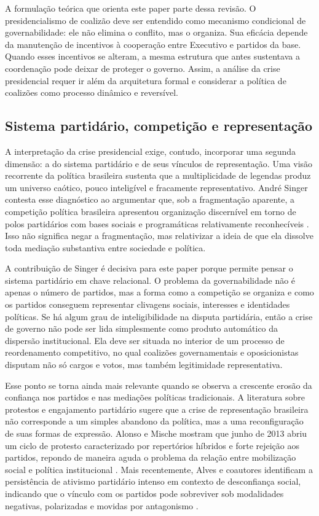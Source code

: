 \documentclass[12pt,a4paper]{article}
\begin{document}
A formulação teórica que orienta este paper parte dessa revisão. O presidencialismo de coalizão deve ser entendido como mecanismo condicional de governabilidade: ele não elimina o conflito, mas o organiza. Sua eficácia depende da manutenção de incentivos à cooperação entre Executivo e partidos da base. Quando esses incentivos se alteram, a mesma estrutura que antes sustentava a coordenação pode deixar de proteger o governo. Assim, a análise da crise presidencial requer ir além da arquitetura formal e considerar a política de coalizões como processo dinâmico e reversível.

\subsection{Sistema partidário, competição e representação}
\label{sec:org97670a2}
A interpretação da crise presidencial exige, contudo, incorporar uma segunda dimensão: a do sistema partidário e de seus vínculos de representação. Uma visão recorrente da política brasileira sustenta que a multiplicidade de legendas produz um universo caótico, pouco inteligível e fracamente representativo. André Singer contesta esse diagnóstico ao argumentar que, sob a fragmentação aparente, a competição política brasileira apresentou organização discernível em torno de polos partidários com bases sociais e programáticas relativamente reconhecíveis \textcite{singersd_tres_partidos}. Isso não significa negar a fragmentação, mas relativizar a ideia de que ela dissolve toda mediação substantiva entre sociedade e política.

A contribuição de Singer é decisiva para este paper porque permite pensar o sistema partidário em chave relacional. O problema da governabilidade não é apenas o número de partidos, mas a forma como a competição se organiza e como os partidos conseguem representar clivagens sociais, interesses e identidades políticas. Se há algum grau de inteligibilidade na disputa partidária, então a crise de governo não pode ser lida simplesmente como produto automático da dispersão institucional. Ela deve ser situada no interior de um processo de reordenamento competitivo, no qual coalizões governamentais e oposicionistas disputam não só cargos e votos, mas também legitimidade representativa.

Esse ponto se torna ainda mais relevante quando se observa a crescente erosão da confiança nos partidos e nas mediações políticas tradicionais. A literatura sobre protestos e engajamento partidário sugere que a crise de representação brasileira não corresponde a um simples abandono da política, mas a uma reconfiguração de suas formas de expressão. Alonso e Mische mostram que junho de 2013 abriu um ciclo de protesto caracterizado por repertórios híbridos e forte rejeição aos partidos, repondo de maneira aguda o problema da relação entre mobilização social e política institucional \textcite{alonso2016_changing_repertoires}. Mais recentemente, Alves e coautores identificam a persistência de ativismo partidário intenso em contexto de desconfiança social, indicando que o vínculo com os partidos pode sobreviver sob modalidades negativas, polarizadas e movidas por antagonismo \textcite{alves2024_rage_within}.
\end{document}
